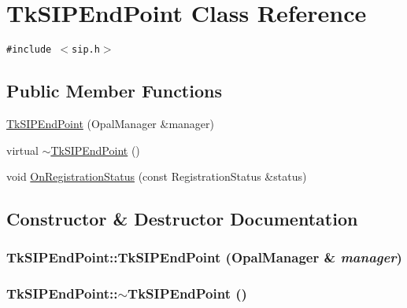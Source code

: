 \hypertarget{classTkSIPEndPoint}{
\section{TkSIPEndPoint Class Reference}
\label{classTkSIPEndPoint}
}
{\tt \#include $<$sip.h$>$}

\subsection*{Public Member Functions}
\begin{CompactItemize}
\item 
\hyperlink{classTkSIPEndPoint_29edc8248c03d069c26e1582847566cc}{TkSIPEndPoint} (OpalManager \&manager)
\item 
virtual \hyperlink{classTkSIPEndPoint_633f50a983cf079f4577ae9316df1922}{$\sim$TkSIPEndPoint} ()
\item 
void \hyperlink{classTkSIPEndPoint_5b93673682f870ade1599d812ef87717}{OnRegistrationStatus} (const RegistrationStatus \&status)
\end{CompactItemize}


\subsection{Constructor \& Destructor Documentation}
\hypertarget{classTkSIPEndPoint_29edc8248c03d069c26e1582847566cc}{
\subsubsection[{TkSIPEndPoint}]{\setlength{\rightskip}{0pt plus 5cm}TkSIPEndPoint::TkSIPEndPoint (OpalManager \& {\em manager})}}
\label{classTkSIPEndPoint_29edc8248c03d069c26e1582847566cc}


\hypertarget{classTkSIPEndPoint_633f50a983cf079f4577ae9316df1922}{
\subsubsection[{$\sim$TkSIPEndPoint}]{\setlength{\rightskip}{0pt plus 5cm}TkSIPEndPoint::$\sim$TkSIPEndPoint ()}}
\label{classTkSIPEndPoint_633f50a983cf079f4577ae9316df1922}




